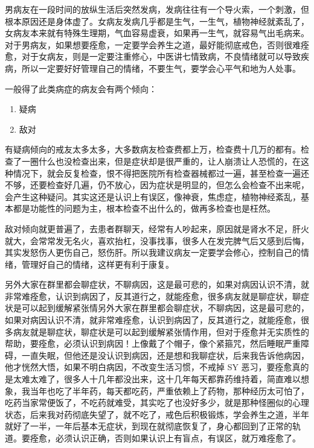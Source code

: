 \documentclass{ctexart}
\begin{document}
男病友在一段时间的放纵生活后突然发病，发病往往有一个导火索，一个刺激，但根本原因还是身体虚了。女病友发病几乎都是生气，一生气，植物神经就紊乱了，女病友本来就有特殊生理期，气血容易虚衰，如果再一生气，就容易气出毛病来。对于男病友，如果想要痊愈，一定要学会养生之道，最好能彻底戒色，否则很难痊愈，对于女病友，则是一定要注重修心，中医讲七情致病，不良情绪就可以导致疾病，所以一定要好好管理自己的情绪，不要生气，要学会心平气和地为人处事。

一般得了此类病症的病友会有两个倾向：

\begin{enumerate}
    \item 疑病
    \item 敌对
\end{enumerate}

有疑病倾向的戒友太多太多，大多数病友检查费都上万，检查费十几万的都有。检查了一圈什么也没检查出来，但是症状却是很严重的，让人崩溃让人恐慌的，在这种情况下，就会反复检查，恨不得把医院所有检查器械都过一遍，甚至检查一遍还不够，还要检查好几遍，仍不放心，因为症状是明显的，但怎么会检查不出来呢，会产生这种疑问。其实这还是认识上有误区，像神衰，焦虑症，植物神经紊乱，基本都是功能性的问题为主，根本检查不出什么的，做再多检查也是枉然。

敌对倾向就更普遍了，去患者群聊天，经常有人吵起来，原因就是肾水不足，肝火就大，会常常发无名火，喜欢抬杠，没事找事，很多人在发完脾气后又感到后悔，其实发怒伤人更伤自己，怒伤肝。所以我建议病友一定要学会修心，控制自己的情绪，管理好自己的情绪，这样更有利于康复。

另外大家在群里都会聊症状，不聊病因，这是最可悲的，如果对病因认识不清，就非常难痊愈，认识到病因了，反其道行之，就能痊愈，很多病友就是聊症状，聊症状是可以起到缓解紧张情另外大家在群里都会聊症状，不聊病因，这是最可悲的，如果对病因认识不清，就非常难痊愈，认识到病因了，反其道行之，就能痊愈，很多病友就是聊症状，聊症状是可以起到缓解紧张情作用，但对于痊愈并无实质性的帮助，要痊愈，必须认识到病因！上像戴了个帽子，像个紧箍咒，然后睡眠严重障碍，一直失眠，但他还是没认识到病因，还是想和我聊症状，后来我告诉他病因，他才恍然大悟，如果不明白病因，不改变生活习惯，不戒掉 SY 恶习，要痊愈真的是太难太难了，很多人十几年都没出来，这十几年每天都靠药维持着，简直难以想象，我当年也吃了半年药，每天都吃药，严重依赖上了药物，那种经历太可怕了，吃药当家常便饭了，不吃药就难受，其实吃了也没好多少，就是那种怪圈似的心理状态，后来我对药彻底失望了，就不吃了，戒色后积极锻炼，学会养生之道，半年就好了一半，一年后基本无症状，到现在就彻底恢复了，身心都回到了正常的轨道。要痊愈，必须认识正确，否则如果认识上有盲点，有误区，就万难痊愈了。
\end{document}
